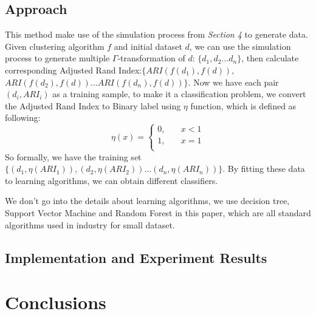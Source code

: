 \documentclass{uonmathreport}
\begin{document}
\subsection{Approach} 
\label{subsec:approach}
This method make use of the simulation process from \textit{Section 4} to generate data. Given clustering algorithm $f$ and initial dataset $d$, we can use the simulation process to generate multiple $\Gamma$-transformation of $d$: $\{d_1,d_2\ldots d_n\}$, then calculate corresponding Adjusted Rand Index:$\{ARI(f(d_1),f(d)),$ $ARI(f(d_2),f(d))
\ldots  ARI(f(d_n),f(d))\}$. Now we have each pair $(d_i,ARI_i)$ as a training sample, to make it a classification problem, we convert the Adjusted Rand Index to Binary label using $\eta$ function, which is defined as following:
\[   
\eta(x) = 
     \begin{cases}
       0, &\quad x<1 \\
       1, &\quad x = 1 \\
     \end{cases}
\]
So formally, we have the training set $\{(d_1,\eta(ARI_1)),(d_2,\eta(ARI_2))\ldots (d_n,\eta(ARI_n))\}$. By fitting these data to learning algorithms, we can obtain different classifiers. 

We don't go into the details about learning algorithms, we use decision tree, Support Vector Machine and Random Forest in this paper, which are all standard algorithms used in industry for small dataset.

\subsection{Implementation and Experiment Results} 
\label{subsec:Experiment}





\section{Conclusions} \label{sec:conclusions}



\newpage

\appendix
\end{document}
